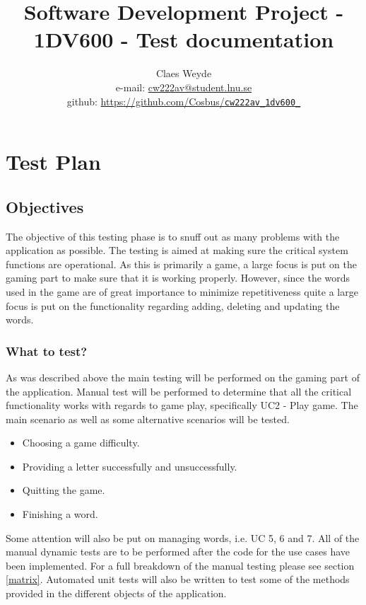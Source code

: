 \documentclass[12pt, letterpaper]{article}
\title{Software Development Project - 1DV600 - Test documentation}
\author{Claes Weyde \\ 
	e-mail: \href{mailto:cw222av@student.lnu.se}{cw222av@student.lnu.se} \\
	github: \href{https://github.com/Cosbus/cw222av_1dv600_}{https://github.com/Cosbus/\texttt{cw222av\_1dv600\_}}}
\begin{document}
\maketitle
\newpage
\tableofcontents{}
\newpage

\section{Test Plan}

\subsection{Objectives}
The objective of this testing phase is to snuff out as many problems with the application as possible. The testing is aimed at making sure the critical system functions are operational. As this is primarily a game, a large focus is put on the gaming part to make sure that it is working properly. However, since the words used in the game are of great importance to minimize repetitiveness quite a large focus is put on the functionality regarding adding, deleting and updating the words.
\subsubsection{What to test?}
As was described above the main testing will be performed on the gaming part of the application. Manual test will be performed to determine that all the critical functionality works with regards to game play, specifically UC2 - Play game. The main scenario as well as some alternative scenarios will be tested.
\begin{itemize}
	\item Choosing a game difficulty.
	\item Providing a letter successfully and unsuccessfully.
	\item Quitting the game.
	\item Finishing a word.
\end{itemize}
Some attention will also be put on managing words, i.e. UC 5, 6 and 7. All of the manual dynamic tests are to be performed after the code for the use cases have been implemented. For a full breakdown of the manual testing please see section \ref{matrix}.
\newline
\newline
Automated unit tests will also be written to test some of the methods provided in the different objects of the application.
\end{document}
